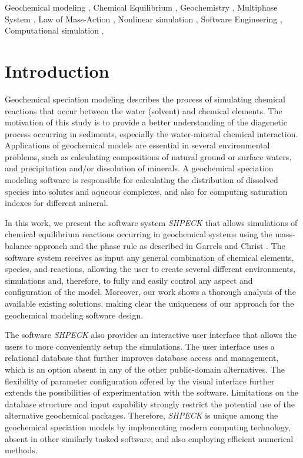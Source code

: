 \documentclass[preprint,12pt,3p]{elsarticle}
\begin{document}
\begin{frontmatter}
\begin{keyword}
Geochemical modeling \sep
Chemical Equilibrium \sep
Geochemistry \sep 
Multiphase System \sep
Law of Mass-Action \sep
Nonlinear simulation \sep
Software Engineering \sep
Computational simulation \sep

\end{keyword}

\end{frontmatter}


\section{Introduction}
Geochemical speciation modeling describes the process of simulating chemical reactions that occur between the water (solvent) and chemical elements. The motivation of this study is to provide a better understanding of the diagenetic process occurring in sediments, especially the water-mineral chemical interaction. Applications of geochemical models are essential in several environmental problems, such as calculating compositions of natural ground or surface waters, and precipitation and/or dissolution of minerals. A geochemical speciation modeling software is responsible for calculating the distribution of dissolved species into solutes and aqueous complexes, and also for computing saturation indexes for different mineral. 

In this work, we present the software system \emph{SHPECK} that allows simulations of chemical equilibrium reactions occurring in geochemical systems using the mass-balance approach and the phase rule as described in Garrels and Christ \cite{Garrels:65}. The software system receives as input any general combination of chemical elements, species, and reactions, allowing the user to create several different environments, simulations and, therefore, to fully and easily control any aspect and configuration of the model. Moreover, our work shows a thorough analysis of the available existing solutions, making clear the uniqueness of our approach for the geochemical modeling software design.

The software \emph{SHPECK} also provides an interactive user interface that allows the users to more conveniently setup the simulations. The user interface uses a relational database that further improves database access and management, which is an option absent in any of the other public-domain alternatives.  The flexibility of parameter configuration offered by the visual interface further extends the possibilities of experimentation with the software. Limitations on the database structure and input capability strongly restrict the potential use of the alternative geochemical packages. Therefore, \emph{SHPECK} is unique among the geochemical speciation models by implementing modern computing technology, absent in other similarly tasked software, and also employing efficient numerical methods.
\end{document}
